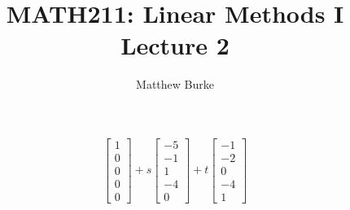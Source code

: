 \message{ !name(2018-09-11slides.tex)}\documentclass{beamer}
\title{MATH211: Linear Methods I\\Lecture 2}
\author{Matthew Burke}
\date{\formatdate{11}{09}{2018}}
\begin{document}
\begin{equation*}
      \left[\begin{array}{r}
              1\\
              0\\
              0\\
              0\\
              0
      \end{array}\right]+s
      \left[\begin{array}{r}
        -5\\
        -1\\
              1\\
              -4\\
              0
      \end{array}\right]+t
      \left[\begin{array}{r}
        -1\\
              -2\\
              0\\
              -4\\
              1
      \end{array}\right]
    \end{equation*}
\end{document}
